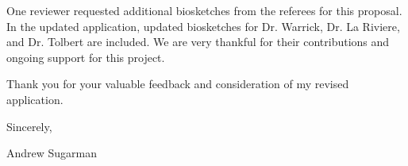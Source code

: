 \documentclass{nihgrant}
\begin{document}
One reviewer requested additional biosketches from the referees for this proposal. In the updated application, updated biosketches for Dr. Warrick, Dr. La Riviere, and Dr. Tolbert are included. We are very thankful for their contributions and ongoing support for this project.

\vspace{2.5mm}

\noindent Thank you for your valuable feedback and consideration of my revised application.

\noindent Sincerely,

\noindent Andrew Sugarman
\end{document}
